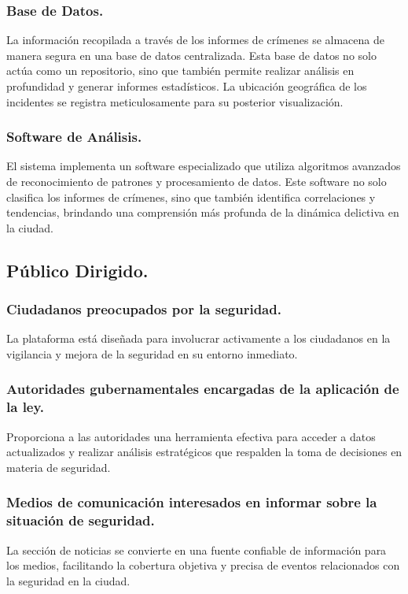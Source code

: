 \documentclass{article}
\begin{document}
        \subsubsection{Base de Datos.}
        La información recopilada a través de los informes de crímenes se almacena de manera segura en una base de datos centralizada. Esta base de datos no solo actúa como un repositorio, sino que también permite realizar análisis en profundidad y generar informes estadísticos. La ubicación geográfica de los incidentes se registra meticulosamente para su posterior visualización.

        \subsubsection{Software de Análisis.}
        El sistema implementa un software especializado que utiliza algoritmos avanzados de reconocimiento de patrones y procesamiento de datos. Este software no solo clasifica los informes de crímenes, sino que también identifica correlaciones y tendencias, brindando una comprensión más profunda de la dinámica delictiva en la ciudad.

    \subsection{Público Dirigido.}

        \subsubsection{Ciudadanos preocupados por la seguridad.}
        La plataforma está diseñada para involucrar activamente a los ciudadanos en la vigilancia y mejora de la seguridad en su entorno inmediato.

        \subsubsection{Autoridades gubernamentales encargadas de la aplicación de la ley.}
        Proporciona a las autoridades una herramienta efectiva para acceder a datos actualizados y realizar análisis estratégicos que respalden la toma de decisiones en materia de seguridad.

        \subsubsection{Medios de comunicación interesados en informar sobre la situación de seguridad.}
        La sección de noticias se convierte en una fuente confiable de información para los medios, facilitando la cobertura objetiva y precisa de eventos relacionados con la seguridad en la ciudad.
\end{document}
